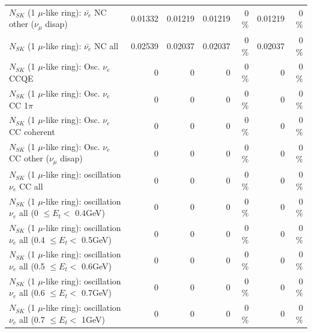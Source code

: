 \begin{table}
\begin{tabular}{| l | r | r | r  r | r  r |}
          $N_{SK}$ (1 $\mu$-like ring): $\bar{\nu_e}$ NC other ($\nu_\mu$ disap) &         0.01332 &         0.01219 &         0.01219 &        0 \%  &         0.01219 &        0 \%  \\ 
                            $N_{SK}$ (1 $\mu$-like ring): $\bar{\nu_{e}}$ NC all &         0.02539 &         0.02037 &         0.02037 &        0 \%  &         0.02037 &        0 \%  \\ 
\hline
\hline
\hline
                                 $N_{SK}$ (1 $\mu$-like ring): Osc. $\nu_e$ CCQE &               0 &               0 &               0 &        0 \%  &               0 &        0 \%  \\ 
                            $N_{SK}$ (1 $\mu$-like ring): Osc. $\nu_e$ CC 1$\pi$ &               0 &               0 &               0 &        0 \%  &               0 &        0 \%  \\ 
                          $N_{SK}$ (1 $\mu$-like ring): Osc. $\nu_e$ CC coherent &               0 &               0 &               0 &        0 \%  &               0 &        0 \%  \\ 
           $N_{SK}$ (1 $\mu$-like ring): Osc. $\nu_e$ CC other ($\nu_\mu$ disap) &               0 &               0 &               0 &        0 \%  &               0 &        0 \%  \\ 
                        $N_{SK}$ (1 $\mu$-like ring): oscillation $\nu_e$ CC all &               0 &               0 &               0 &        0 \%  &               0 &        0 \%  \\ 
\hline
$N_{SK}$ (1 $\mu$-like ring): oscillation $\nu_{e}$ all (0 $\leq E_{t} <$ 0.4GeV) &               0 &               0 &               0 &        0 \%  &               0 &        0 \%  \\ 
$N_{SK}$ (1 $\mu$-like ring): oscillation $\nu_{e}$ all (0.4 $\leq E_{t} <$ 0.5GeV) &               0 &               0 &               0 &        0 \%  &               0 &        0 \%  \\ 
$N_{SK}$ (1 $\mu$-like ring): oscillation $\nu_{e}$ all (0.5 $\leq E_{t} <$ 0.6GeV) &               0 &               0 &               0 &        0 \%  &               0 &        0 \%  \\ 
$N_{SK}$ (1 $\mu$-like ring): oscillation $\nu_{e}$ all (0.6 $\leq E_{t} <$ 0.7GeV) &               0 &               0 &               0 &        0 \%  &               0 &        0 \%  \\ 
$N_{SK}$ (1 $\mu$-like ring): oscillation $\nu_{e}$ all (0.7 $\leq E_{t} <$ 1GeV) &               0 &               0 &               0 &        0 \%  &               0 &        0 \%  \\ 

\end{tabular}
\end{table}
